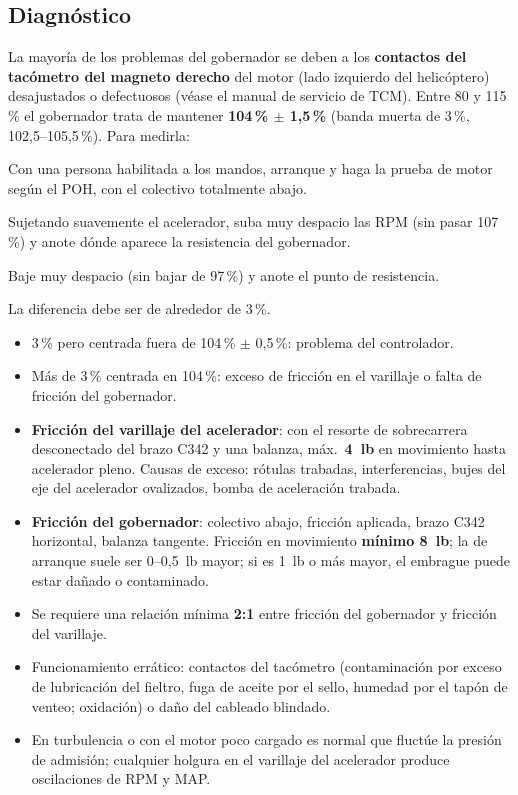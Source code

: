 \subsection{Diagnóstico}

La mayoría de los problemas del gobernador se deben a los \textbf{contactos del tacómetro del magneto derecho} del motor (lado izquierdo del helicóptero) desajustados o defectuosos (véase el manual de servicio de TCM). Entre 80 y 115\,\% el gobernador trata de mantener \textbf{104\,\% $\pm$ 1,5\,\%} (banda muerta de 3\,\%, 102,5--105,5\,\%). Para medirla:

\begin{pasos}
\item Con una persona habilitada a los mandos, arranque y haga la prueba de motor según el POH, con el colectivo totalmente abajo.
\item Sujetando suavemente el acelerador, suba muy despacio las RPM (sin pasar 107\,\%) y anote dónde aparece la resistencia del gobernador.
\item Baje muy despacio (sin bajar de 97\,\%) y anote el punto de resistencia.
\item La diferencia debe ser de alrededor de 3\,\%.
\end{pasos}

\begin{itemize}
\item 3\,\% pero centrada fuera de 104\,\% $\pm$ 0,5\,\%: problema del controlador.
\item Más de 3\,\% centrada en 104\,\%: exceso de fricción en el varillaje o falta de fricción del gobernador.
\item \textbf{Fricción del varillaje del acelerador}: con el resorte de sobrecarrera desconectado del brazo C342 y una balanza, máx.\ \textbf{4~lb} en movimiento hasta acelerador pleno. Causas de exceso: rótulas trabadas, interferencias, bujes del eje del acelerador ovalizados, bomba de aceleración trabada.
\item \textbf{Fricción del gobernador}: colectivo abajo, fricción aplicada, brazo C342 horizontal, balanza tangente. Fricción en movimiento \textbf{mínimo 8~lb}; la de arranque suele ser 0--0,5~lb mayor; si es 1~lb o más mayor, el embrague puede estar dañado o contaminado.
\item Se requiere una relación mínima \textbf{2:1} entre fricción del gobernador y fricción del varillaje.
\item Funcionamiento errático: contactos del tacómetro (contaminación por exceso de lubricación del fieltro, fuga de aceite por el sello, humedad por el tapón de venteo; oxidación) o daño del cableado blindado.
\item En turbulencia o con el motor poco cargado es normal que fluctúe la presión de admisión; cualquier holgura en el varillaje del acelerador produce oscilaciones de RPM y MAP.
\end{itemize}

